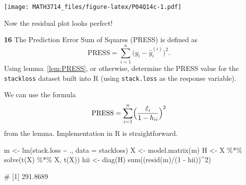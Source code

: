 \documentclass[
  a4paper,
]{article}
\newenvironment{Shaded}{\begin{snugshade}}{\end{snugshade}}
\newcommand{\AttributeTok}[1]{\textcolor[rgb]{0.77,0.63,0.00}{#1}}
\newcommand{\DecValTok}[1]{\textcolor[rgb]{0.00,0.00,0.81}{#1}}
\newcommand{\FunctionTok}[1]{\textcolor[rgb]{0.00,0.00,0.00}{#1}}
\newcommand{\NormalTok}[1]{#1}
\newcommand{\OtherTok}[1]{\textcolor[rgb]{0.56,0.35,0.01}{#1}}
\newcommand{\SpecialCharTok}[1]{\textcolor[rgb]{0.00,0.00,0.00}{#1}}
\theoremstyle{definition}
\theoremstyle{definition}
\theoremstyle{definition}
\theoremstyle{definition}
\theoremstyle{remark}
\begin{document}
\begin{myanswers}
\begin{Shaded}
\end{Shaded}

\texttt{[image: MATH3714\_files/figure-latex/P04Q14c-1.pdf]}

Now the residual plot looks perfect!

\end{myanswers}

\textbf{16} The Prediction Error Sum of Squares (PRESS) is defined as
\begin{equation*}
  \mathrm{PRESS}
  = \sum_{i=1}^n \bigl( y_i - \hat y^{(i)}_i \bigr)^2.
\end{equation*}
Using lemma~\ref{lem:PRESS}, or otherwise, determine the PRESS
value for the \texttt{stackloss} dataset built into R (using \texttt{stack.loss}
as the response variable).

\begin{myanswers}

We can use the formula
\begin{equation*}
  \mathrm{PRESS}
  = \sum_{i=1}^n \Bigl( \frac{\hat\varepsilon_i}{1 - h_{ii}} \Bigr)^2
\end{equation*}
from the lemma. Implementation in R is straightforward.

\begin{Shaded}
\begin{Highlighting}[]
\NormalTok{m }\OtherTok{\textless{}{-}} \FunctionTok{lm}\NormalTok{(stack.loss }\SpecialCharTok{\textasciitilde{}}\NormalTok{ ., }\AttributeTok{data =}\NormalTok{ stackloss)}
\NormalTok{X }\OtherTok{\textless{}{-}} \FunctionTok{model.matrix}\NormalTok{(m)}
\NormalTok{H }\OtherTok{\textless{}{-}}\NormalTok{ X }\SpecialCharTok{\%*\%} \FunctionTok{solve}\NormalTok{(}\FunctionTok{t}\NormalTok{(X) }\SpecialCharTok{\%*\%}\NormalTok{ X, }\FunctionTok{t}\NormalTok{(X))}
\NormalTok{hii }\OtherTok{\textless{}{-}} \FunctionTok{diag}\NormalTok{(H)}
\FunctionTok{sum}\NormalTok{((}\FunctionTok{resid}\NormalTok{(m)}\SpecialCharTok{/}\NormalTok{(}\DecValTok{1} \SpecialCharTok{{-}}\NormalTok{ hii))}\SpecialCharTok{\^{}}\DecValTok{2}\NormalTok{)}
\end{Highlighting}
\end{Shaded}

\begin{Shaded}
\begin{Highlighting}[]
\NormalTok{\# [1] 291.8689}
\end{Highlighting}
\end{Shaded}

\end{myanswers}
\end{document}
